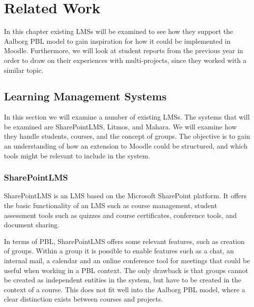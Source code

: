 \chapter{Related Work}
\label{chap:relatedwork}
In this chapter existing LMSs will be examined to see how they support the Aalborg PBL model to gain inspiration for how it could be implemented in Moodle.
Furthermore, we will look at student reports from the previous year in order to draw on their experiences with multi-projects, since they worked with a similar topic.

\section{Learning Management Systems}\label{sec:LMS}
In this section we will examine a number of existing LMSs.
The systems that will be examined are SharePointLMS, Litmos, and Mahara.
We will examine how they handle students, courses, and the concept of groups.
The objective is to gain an understanding of how an extension to Moodle could be structured, and which tools might be relevant to include in the system.

\subsection{SharePointLMS}
SharePointLMS \citep{sharepointlms} is an LMS based on the Microsoft SharePoint platform. 
It offers the basic functionality of an LMS such as course management, student assessment tools such as quizzes and course certificates, conference tools, and document sharing.

In terms of PBL, SharePointLMS offers some relevant features, such as creation of groups.
Within a group it is possible to enable features such as a chat, an internal mail, a calendar and an online conference tool for meetings that could be useful when working in a PBL context.
The only drawback is that groups cannot be created as independent entities in the system, but have to be created in the context of a course.
This does not fit well into the Aalborg PBL model, where a clear distinction exists between courses and projects.

